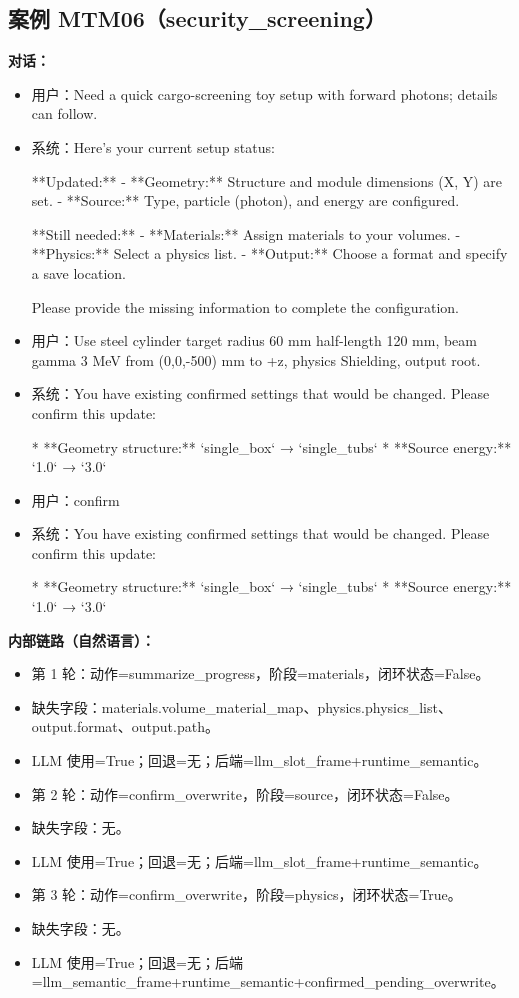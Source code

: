 \documentclass[11pt]{ctexart}
\begin{document}
\subsection{案例 MTM06（security\_screening）}
\textbf{对话：}
\begin{itemize}
\item 用户：Need a quick cargo-screening toy setup with forward photons; details can follow.
\item 系统：Here's your current setup status:

**Updated:**
- **Geometry:** Structure and module dimensions (X, Y) are set.
- **Source:** Type, particle (photon), and energy are configured.

**Still needed:**
- **Materials:** Assign materials to your volumes.
- **Physics:** Select a physics list.
- **Output:** Choose a format and specify a save location.

Please provide the missing information to complete the configuration.
\item 用户：Use steel cylinder target radius 60 mm half-length 120 mm, beam gamma 3 MeV from (0,0,-500) mm to +z, physics Shielding, output root.
\item 系统：You have existing confirmed settings that would be changed. Please confirm this update:

*   **Geometry structure:** `single\_box` → `single\_tubs`
*   **Source energy:** `1.0` → `3.0`
\item 用户：confirm
\item 系统：You have existing confirmed settings that would be changed. Please confirm this update:

*   **Geometry structure:** `single\_box` → `single\_tubs`
*   **Source energy:** `1.0` → `3.0`
\end{itemize}
\textbf{内部链路（自然语言）：}
\begin{itemize}
\item 第 1 轮：动作=summarize\_progress，阶段=materials，闭环状态=False。
\item 缺失字段：materials.volume\_material\_map、physics.physics\_list、output.format、output.path。
\item LLM 使用=True；回退=无；后端=llm\_slot\_frame+runtime\_semantic。
\item 第 2 轮：动作=confirm\_overwrite，阶段=source，闭环状态=False。
\item 缺失字段：无。
\item LLM 使用=True；回退=无；后端=llm\_slot\_frame+runtime\_semantic。
\item 第 3 轮：动作=confirm\_overwrite，阶段=physics，闭环状态=True。
\item 缺失字段：无。
\item LLM 使用=True；回退=无；后端=llm\_semantic\_frame+runtime\_semantic+confirmed\_pending\_overwrite。
\end{itemize}
\end{document}
